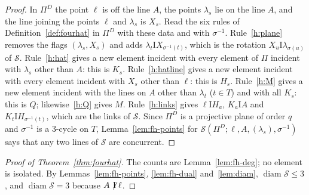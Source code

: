 \documentclass[11pt]{amsart}
\theoremstyle{definition}
\theoremstyle{remark}
\newcommand{\cS}{\mathcal{S}}
\newcommand{\I}{\mathrel{\mathrm{I}}}
\newcommand{\nI}{\mathrel{\not\!\mathrm{I}}}
\newcommand{\diam}{\operatorname{diam}}
\newcommand{\lam}{\lambda}
\begin{document}
\begin{proof}
In $\Pi^D$ the point $\ell$ is off the line $A$, the points $\lam_s$ lie on the line $A$, and the line joining the points $\ell$ and $\lam_s$ is $X_s$. Read the six rules of Definition~\ref{def:fourhat} in $\Pi^D$ with these data and with $\sigma^{-1}$. Rule~\ref{h:plane} removes the flags $(\lam_s,X_s)$ and adds $\lam_t\I X_{\sigma^{-1}(t)}$, which is the rotation $X_u\I\lam_{\sigma(u)}$ of $\cS$. Rule~\ref{h:hat} gives a new element incident with every element of $\Pi$ incident with $\lam_s$ other than $A$: this is $K_s$. Rule~\ref{h:hatline} gives a new element incident with every element incident with $X_s$ other than $\ell$: this is $H_s$. Rule~\ref{h:M} gives a new element incident with the lines on $A$ other than $\lam_t$ ($t\in T$) and with all $K_s$: this is $Q$; likewise~\ref{h:Q} gives $M$. Rule~\ref{h:links} gives $\ell\I H_a$, $K_a\I A$ and $K_t\I H_{\sigma^{-1}(t)}$, which are the links of $\cS$. Since $\Pi^D$ is a projective plane of order $q$ and $\sigma^{-1}$ is a $3$-cycle on $T$, Lemma~\ref{lem:fh-points} for $\cS(\Pi^D;\ell,A,(\lam_s),\sigma^{-1})$ says that any two lines of $\cS$ are concurrent.
\end{proof}

\begin{proof}[Proof of Theorem~\ref{thm:fourhat}]
The counts are Lemma~\ref{lem:fh-deg}; no element is isolated. By Lemmas~\ref{lem:fh-points}, \ref{lem:fh-dual} and~\ref{lem:diam}, $\diam\cS\le3$, and $\diam\cS=3$ because $A\nI\ell$.
\end{proof}
\end{document}
